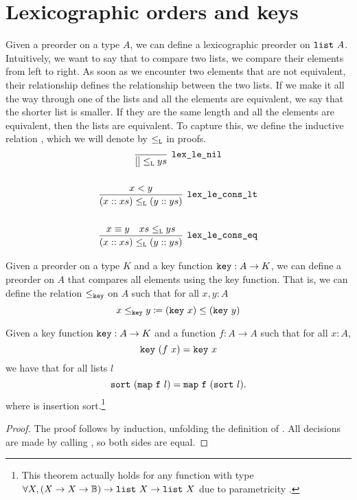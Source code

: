 \documentclass[sigplan,10pt,anonymous,review]{thesis}
\begin{document}
\section{Lexicographic orders and keys}
\label{sec:lex_ord}

Given a preorder on a type $A$, we can define a lexicographic preorder
on $\texttt{list}~A$. Intuitively, we want to say that to compare two
lists, we compare their elements from left to right. As soon as we
encounter two elements that are not equivalent, their relationship
defines the relationship between the two lists. If we make it all the
way through one of the lists and all the elements are equivalent, we
say that the shorter list is smaller. If they are the same length and
all the elements are equivalent, then the lists are equivalent. To
capture this, we define the inductive relation , which we
will denote by $\le_{\texttt{L}}$ in proofs.
\begin{gather*}
  \infer[\var{lex\_le\_nil}]{[] \lexle ys}{}
  \\
  \\
  \infer[\var{lex\_le\_cons\_lt}]{(x :: xs) \lexle (y :: ys)}{%
    x < y
  }
  \\
  \\
  \infer[\var{lex\_le\_cons\_eq}]{(x :: xs) \lexle (y :: ys)}{%
    x \equiv y & xs \lexle ys
  }
\end{gather*}

Given a preorder on a type $K$ and a key function $\texttt{key} : A \to K$,
we can define a preorder on $A$ that compares all elements using the
key function. That is, we can define the relation $\le_{\texttt{key}}$ on
$A$ such that for all $x, y : A$
\begin{equation*}
  x \le_{\texttt{key}} y \coloneqq (\texttt{key}~x) \le (\texttt{key}~y)
\end{equation*}

\begin{theorem}
  Given a key function $\texttt{key} : A \to K$ and a function $f : A \to A$
  such that for all $x : A$,
  \begin{equation*}
    \texttt{key}~(f~x) = \texttt{key}~x
  \end{equation*}
  we have that for all lists $l$
  \begin{equation*}
    \texttt{sort}~(\texttt{map}~\texttt{f}~l) = \texttt{map}~\texttt{f}~(\texttt{sort}~l).
  \end{equation*}
  where  is insertion sort.\footnote{This theorem actually
    holds for any function with type $\forall X, (X \to X \to \mathbb{B}) \to
    \texttt{list}~X \to \texttt{list}~X$ due to parametricity \cite{free}.}
\end{theorem}
\begin{proof}
  The proof follows by induction, unfolding the definition of
  . All decisions are made by calling , so both
  sides are equal.
\end{proof}
\end{document}
